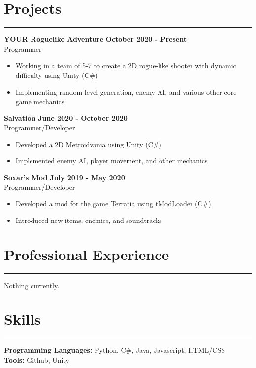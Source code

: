 \documentclass{article}
\begin{document}
\section*{Projects} \vspace{-6pt} \hrule \vspace{6pt}
\textbf{YOUR Roguelike Adventure} \hfill \textbf{October 2020 - Present}\\
Programmer
\begin{itemize}
	\item\vspace{-6pt} Working in a team of 5-7 to create a 2D rogue-like shooter with dynamic difficulty using Unity (C$\#$)
	\item\vspace{-6pt} Implementing random level generation, enemy AI, and various other core game mechanics
\end{itemize}
\vspace{-6pt}
\textbf{Salvation} \hfill \textbf{June 2020 - October 2020}\\
Programmer/Developer
\begin{itemize}
	\item\vspace{-6pt} Developed a 2D Metroidvania using Unity (C$\#$)
	\item\vspace{-6pt} Implemented enemy AI, player movement, and other mechanics
\end{itemize}
\vspace{-6pt}
\textbf{Soxar's Mod} \hfill \textbf{July 2019 - May 2020}\\
Programmer/Developer
\begin{itemize}
	\item\vspace{-6pt} Developed a mod for the game Terraria using tModLoader (C$\#$)
	\item\vspace{-6pt} Introduced new items, enemies, and soundtracks
\end{itemize}
\vspace{-20pt}


\section*{Professional Experience} \vspace{-6pt} \hrule \vspace{6pt}
Nothing currently.
\vspace{-10pt}

\section*{Skills} \vspace{-6pt} \hrule \vspace{6pt}
\textbf{Programming Languages:} Python, C$\#$, Java, Javascript, HTML/CSS\\
\textbf{Tools:} Github, Unity
\end{document}
